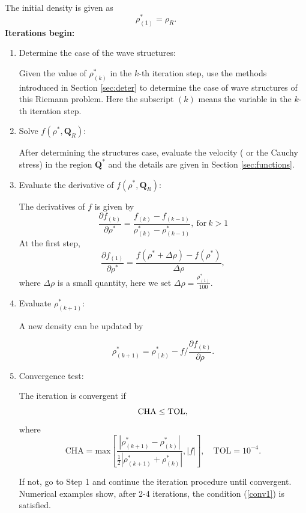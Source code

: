 \documentclass{article}
\numberwithin{equation}{section}
\numberwithin{table}{section}
\begin{document}
	The initial density is  given as
\begin{equation}
\rho_{(1)}^* = \rho_R.
\end{equation}
\textbf{Iterations begin:}
\begin{enumerate}[Step 1]
  \item Determine the case of the wave structures:

	Given the value of  $\rho _{(k)}^*$ in the $k$-th iteration step, use the methods introduced in Section \ref{sec:deter} to determine the case of wave structures of this Riemann problem. Here the subscript $(k)$ means the variable in the $k$-th  iteration step.


  \item Solve $f(\rho^*,\mathbf{Q}_R)$:
	
	After determining the structures case, evaluate the velocity ( or  the Cauchy stress) in  the region $\mathbf{Q}^*$ and the details are given in Section \ref{sec:functions}.

  \item Evaluate the derivative of  $f(\rho^*,\mathbf{Q}_R)$:

The derivatives of $f$ is  given by
\begin{equation*}
  \frac{\partial f_{(k)}}{\partial \rho^*} = \frac{f_{(k)}-f_{(k-1)}}{\rho_{(k)}^* - \rho^*_{(k-1)}}, \ \text{for} \ k>1
\end{equation*}
At the first step, %
\begin{equation*}
  \frac{\partial f_{(1)}}{\partial \rho^*} = \frac{f(\rho^*+\Delta \rho)-f(\rho^*)}{\Delta \rho},
\end{equation*}
where $\Delta \rho$ is a small quantity, here we set $\Delta \rho = \frac{\rho_{(1)}^*}{100}$.

  \item  Evaluate  $\rho^*_{(k+1)}$:
	
A new density can be updated by

\begin{equation*}
 \rho^*_{(k+1)} = \rho^*_{(k)}- f/\frac{\partial f_{(k)}}{\partial \rho}.
\end{equation*}

\item Convergence test:


The iteration is convergent if
\begin{equation}{\label{conv1}}
  \text{CHA} \le \text{TOL},
\end{equation}
where
\begin{equation*}
\text{CHA} = \text{max} \left[
\frac{|\rho_{(k+1)}^*- \rho_{(k)}^*|}{\frac{1}{2}|\rho_{(k+1)}^*+\rho_{(k)}^*|},|f|\right], \quad \text{TOL} = 10^{-4}.
\end{equation*}

If not, go to Step 1 and continue the iteration procedure until convergent. Numerical examples show, after 2-4 iterations, the condition (\ref{conv1}) is satisfied.
\end{enumerate}
\end{document}
